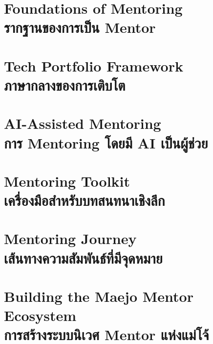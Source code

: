 \documentclass[12pt,a4paper,openany]{book}
\begin{document}
\frontmatter



\tableofcontents

\mainmatter
\part{Foundations of Mentoring\\รากฐานของการเป็น Mentor}


\part{Tech Portfolio Framework\\ภาษากลางของการเติบโต}









\part{AI-Assisted Mentoring\\การ Mentoring โดยมี AI เป็นผู้ช่วย}



\part{Mentoring Toolkit\\เครื่องมือสำหรับบทสนทนาเชิงลึก}




\part{Mentoring Journey\\เส้นทางความสัมพันธ์ที่มีจุดหมาย}


\part{Building the Maejo Mentor Ecosystem\\การสร้างระบบนิเวศ Mentor แห่งแม่โจ้}


\appendix




\end{document}
